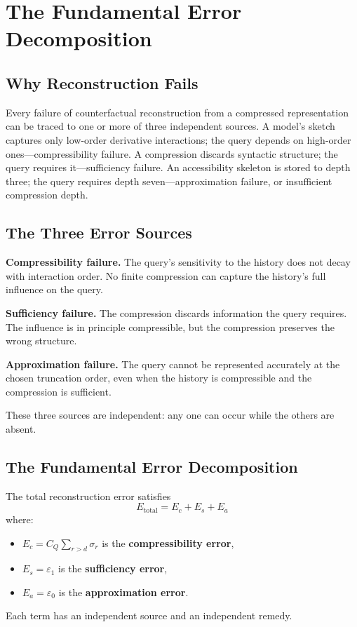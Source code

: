 \chapter{The Fundamental Error Decomposition}

\section{Why Reconstruction Fails}

Every failure of counterfactual reconstruction from a compressed representation can be traced to one or more of three independent sources. A model's sketch captures only low-order derivative interactions; the query depends on high-order ones---compressibility failure. A compression discards syntactic structure; the query requires it---sufficiency failure. An accessibility skeleton is stored to depth three; the query requires depth seven---approximation failure, or insufficient compression depth.

\section{The Three Error Sources}

\textbf{Compressibility failure.} The query's sensitivity to the history does not decay with interaction order. No finite compression can capture the history's full influence on the query.

\textbf{Sufficiency failure.} The compression discards information the query requires. The influence is in principle compressible, but the compression preserves the wrong structure.

\textbf{Approximation failure.} The query cannot be represented accurately at the chosen truncation order, even when the history is compressible and the compression is sufficient.

These three sources are independent: any one can occur while the others are absent.

\section{The Fundamental Error Decomposition}

\begin{definition}
The total reconstruction error satisfies
\[
  E_{\mathrm{total}} = E_c + E_s + E_a
\]
where:
\begin{itemize}
  \item $E_c = C_Q \sum_{r>d} \sigma_r$ is the \textbf{compressibility error},
  \item $E_s = \varepsilon_1$ is the \textbf{sufficiency error},
  \item $E_a = \varepsilon_0$ is the \textbf{approximation error}.
\end{itemize}
Each term has an independent source and an independent remedy.
\end{definition}


